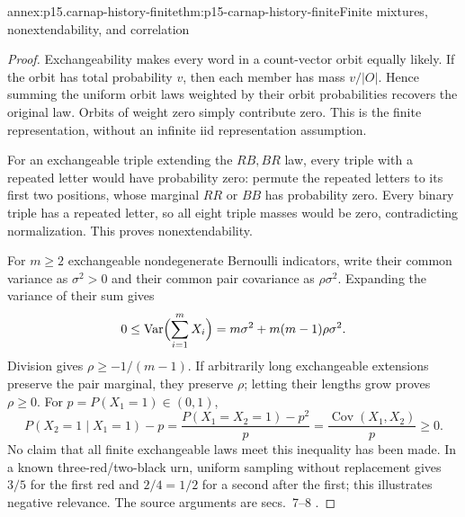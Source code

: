 \begin{annexitem}{annex:p15.carnap-history-finite}{thm:p15-carnap-history-finite}{Finite mixtures, nonextendability, and correlation}
\begin{proof}
Exchangeability makes every word in a count-vector orbit equally likely.
If the orbit has total probability \(v\), then each member has mass
\(v/|O|\). Hence summing the uniform orbit laws weighted by their
orbit probabilities recovers the original law. Orbits of weight zero
simply contribute zero. This is the finite representation, without an
infinite iid representation assumption.

For an exchangeable triple extending the \(RB,BR\) law, every
triple with a repeated letter would have probability zero: permute the
repeated letters to its first two positions, whose marginal \(RR\)
or \(BB\) has probability zero. Every binary triple has a repeated
letter, so all eight triple masses would be zero, contradicting
normalization. This proves nonextendability.

For \(m\geq2\) exchangeable nondegenerate Bernoulli indicators,
write their common variance as \(\sigma^2>0\) and their common
pair covariance as \(\rho\sigma^2\). Expanding the variance of
their sum gives
\[
 0\leq\operatorname{Var}\Bigl(\sum_{i=1}^mX_i\Bigr)
   =m\sigma^2+m(m-1)\rho\sigma^2.
\]
Division gives \(\rho\geq-1/(m-1)\). If arbitrarily long
exchangeable extensions preserve the pair marginal, they preserve
\(\rho\); letting their lengths grow proves \(\rho\geq0\).
For \(p=P(X_1=1)\in(0,1)\),
\[
 P(X_2=1\mid X_1=1)-p
 =\frac{P(X_1=X_2=1)-p^2}{p}
 =\frac{\operatorname{Cov}(X_1,X_2)}p\geq0.
\]
No claim that all finite exchangeable laws meet this inequality has been
made. In a known three-red/two-black urn, uniform sampling without
replacement gives \(3/5\) for the first red and \(2/4=1/2\)
for a second after the first; this illustrates negative relevance.
The source arguments are secs.~7--8
\cite{Zabell2011CarnapInductiveInference}.
\end{proof}
\end{annexitem}

